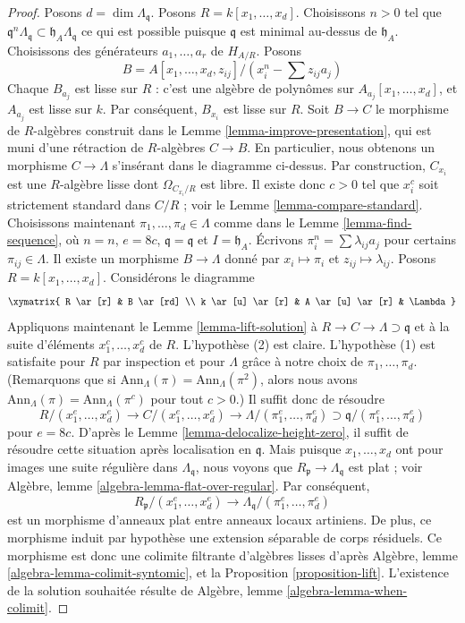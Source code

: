 \begin{proof}
Posons $d = \dim \Lambda_\mathfrak q$. Posons $R = k[x_1, \ldots, x_d]$.
Choisissons $n > 0$ tel que
$\mathfrak q^n\Lambda_\mathfrak q \subset \mathfrak h_A\Lambda_\mathfrak q$
ce qui est possible puisque $\mathfrak q$ est minimal au-dessus de $\mathfrak h_A$.
Choisissons des générateurs $a_1, \ldots, a_r$ de $H_{A/R}$. Posons
$$
B = A[x_1, \ldots, x_d, z_{ij}]/(x_i^n - \sum z_{ij}a_j)
$$
Chaque $B_{a_j}$ est lisse sur $R$ : c'est une algèbre de polynômes
sur $A_{a_j}[x_1, \ldots, x_d]$, et $A_{a_j}$ est lisse sur $k$.
Par conséquent, $B_{x_i}$ est lisse sur $R$. Soit $B \to C$ le morphisme de $R$-algèbres
construit dans le Lemme \ref{lemma-improve-presentation},
qui est muni d'une rétraction de $R$-algèbres $C \to B$. En particulier,
nous obtenons un morphisme $C \to \Lambda$ s'insérant dans le diagramme ci-dessus.
Par construction, $C_{x_i}$ est une $R$-algèbre lisse dont
$\Omega_{C_{x_i}/R}$ est libre. Il existe donc $c > 0$
tel que $x_i^c$ soit strictement standard dans $C/R$ ; voir le
Lemme \ref{lemma-compare-standard}.
Choisissons maintenant $\pi_1, \ldots, \pi_d \in \Lambda$ comme dans le
Lemme \ref{lemma-find-sequence},
où $n = n$, $e = 8c$, $\mathfrak q = \mathfrak q$ et $I = \mathfrak h_A$.
Écrivons $\pi_i^n = \sum \lambda_{ij} a_j$ pour certains $\pi_{ij} \in \Lambda$.
Il existe un morphisme $B \to \Lambda$ donné par $x_i \mapsto \pi_i$
et $z_{ij} \mapsto \lambda_{ij}$. Posons $R = k[x_1, \ldots, x_d]$.
Considérons le diagramme
$$
\xymatrix{
R \ar[r] & B \ar[rd] \\
k \ar[u] \ar[r] & A \ar[u] \ar[r] & \Lambda
}
$$
Appliquons maintenant le
Lemme \ref{lemma-lift-solution}
à $R \to C \to \Lambda \supset \mathfrak q$
et à la suite d'éléments $x_1^c, \ldots, x_d^c$ de $R$.
L'hypothèse (2) est claire. L'hypothèse (1) est satisfaite pour $R$
par inspection et pour $\Lambda$ grâce à notre choix de
$\pi_1, \ldots, \pi_d$. (Remarquons que si
$\text{Ann}_\Lambda(\pi) = \text{Ann}_\Lambda(\pi^2)$, alors nous avons
$\text{Ann}_\Lambda(\pi) = \text{Ann}_\Lambda(\pi^c)$ pour tout $c > 0$.)
Il suffit donc de résoudre
$$
R/(x_1^e, \ldots, x_d^e) \to C/(x_1^e, \ldots, x_d^e) \to
\Lambda/(\pi_1^e, \ldots, \pi_d^e) \supset
\mathfrak q/(\pi_1^e, \ldots, \pi_d^e)
$$
pour $e = 8c$. D'après le
Lemme \ref{lemma-delocalize-height-zero},
il suffit de résoudre cette situation après localisation en $\mathfrak q$.
Mais puisque $x_1, \ldots, x_d$ ont pour images une suite régulière
dans $\Lambda_\mathfrak q$, nous voyons que $R_\mathfrak p \to \Lambda_\mathfrak q$
est plat ; voir Algèbre, lemme \ref{algebra-lemma-flat-over-regular}. Par conséquent,
$$
R_\mathfrak p/(x_1^e, \ldots, x_d^e) \to
\Lambda_\mathfrak q/(\pi_1^e, \ldots, \pi_d^e)
$$
est un morphisme d'anneaux plat entre anneaux locaux artiniens.
De plus, ce morphisme induit par hypothèse une extension séparable
de corps résiduels. Ce morphisme est donc une colimite filtrante
d'algèbres lisses d'après
Algèbre, lemme \ref{algebra-lemma-colimit-syntomic},
et la Proposition \ref{proposition-lift}.
L'existence de la solution souhaitée résulte de
Algèbre, lemme \ref{algebra-lemma-when-colimit}.
\end{proof}
